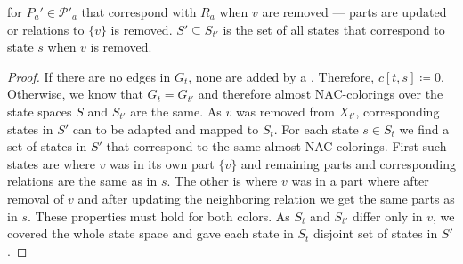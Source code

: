 for \( P_a' \in \mathcal{P'}_a \) that correspond with \( R_a \) when \( v \) are removed
--- parts are updated or relations to \( \{v\} \) is removed.
\( S' \subseteq S_{t'} \) is the set of all states that
correspond to state \( s \) when \( v \) is removed.
%
\begin{proof}
	If there are no edges in \( G_t \), none are added by a \ForgetVertexNode{}.
	Therefore, \( c[t, s] \coloneqq 0 \).
	Otherwise, we know that \( G_t = G_{t'} \) and therefore
	almost NAC-colorings over the
	state spaces \( S \) and \( S_{t'} \) are the same.
	As \( v \) was removed from \( X_{t'} \),
	corresponding states in \( S' \) can to be adapted and mapped to \( S_t \).
	For each state \( s \in S_t \) we find a set of states in \( S' \)
	that correspond to the same almost NAC-colorings.
	First such states are where \( v \) was in its own part \( \{v\} \)
	and remaining parts and corresponding relations are the same as in \( s \).
	The other is where \( v \) was in a part where after removal of \( v \) and
	after updating the neighboring relation we get the same parts as in \( s \).
	These properties must hold for both colors.
	As \( S_t \) and \( S_{t'} \) differ only in \( v \),
	we covered the whole state space and gave each state in \( S_t \) disjoint
	set of states in \( S' \).

\end{proof}
%

